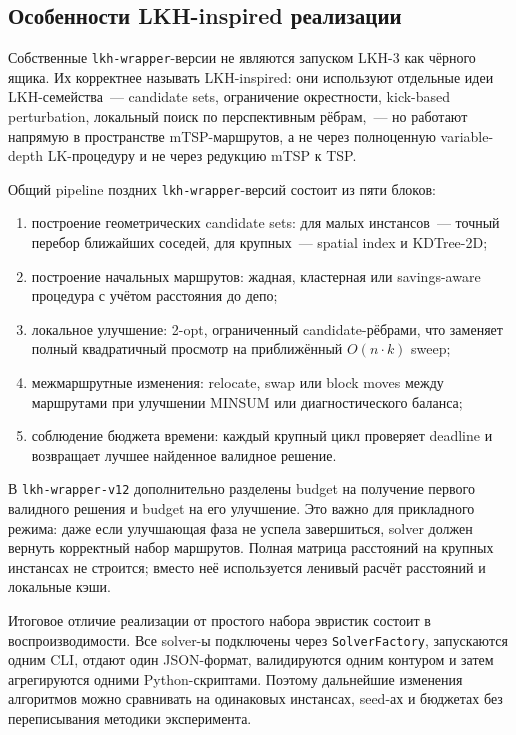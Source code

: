 \documentclass[14pt,a4paper]{extarticle}
\begin{document}
\subsection{Особенности LKH-inspired реализации}

Собственные \texttt{lkh-wrapper}-версии не являются запуском LKH-3 как чёрного ящика. Их корректнее называть LKH-inspired: они используют отдельные идеи LKH-семейства~--- candidate sets, ограничение окрестности, kick-based perturbation, локальный поиск по перспективным рёбрам,~--- но работают напрямую в пространстве mTSP-маршрутов, а не через полноценную variable-depth LK-процедуру и не через редукцию mTSP к TSP.

Общий pipeline поздних \texttt{lkh-wrapper}-версий состоит из пяти блоков:
\begin{enumerate}
  \item построение геометрических candidate sets: для малых инстансов~--- точный перебор ближайших соседей, для крупных~--- spatial index и KDTree-2D;
  \item построение начальных маршрутов: жадная, кластерная или savings-aware процедура с учётом расстояния до депо;
  \item локальное улучшение: 2-opt, ограниченный candidate-рёбрами, что заменяет полный квадратичный просмотр на приближённый $O(n \cdot k)$ sweep;
  \item межмаршрутные изменения: relocate, swap или block moves между маршрутами при улучшении MINSUM или диагностического баланса;
  \item соблюдение бюджета времени: каждый крупный цикл проверяет deadline и возвращает лучшее найденное валидное решение.
\end{enumerate}

В \texttt{lkh-wrapper-v12} дополнительно разделены budget на получение первого валидного решения и budget на его улучшение. Это важно для прикладного режима: даже если улучшающая фаза не успела завершиться, solver должен вернуть корректный набор маршрутов. Полная матрица расстояний на крупных инстансах не строится; вместо неё используется ленивый расчёт расстояний и локальные кэши.

Итоговое отличие реализации от простого набора эвристик состоит в воспроизводимости. Все solver-ы подключены через \texttt{SolverFactory}, запускаются одним CLI, отдают один JSON-формат, валидируются одним контуром и затем агрегируются одними Python-скриптами. Поэтому дальнейшие изменения алгоритмов можно сравнивать на одинаковых инстансах, seed-ах и бюджетах без переписывания методики эксперимента.
\end{document}

